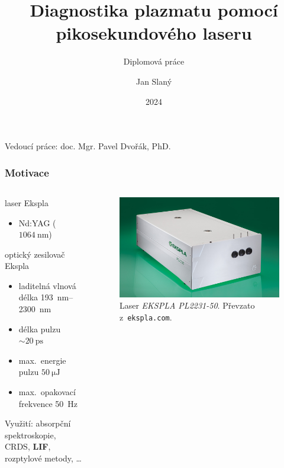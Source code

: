 \documentclass[10pt]{beamer}
\title[Laserová diagnostika plazmatu]
{Diagnostika plazmatu pomocí pikosekundového laseru}
\subtitle{Diplomová práce}
\date{2024}
\author{Jan Slaný}
\institute[PřF MUNI]{Přírodovědecká fakulta Masarykovy univerzity\\
	Ústav fyziky a~technologií plazmatu}
\begin{document}
\begin{frame}[plain]
	\titlepage
	Vedoucí práce: \hfill doc. Mgr. Pavel Dvořák, PhD.
\end{frame}

\begin{frame}
	\frametitle{Motivace}
	\begin{columns}
	\begin{column}{0.5\textwidth}
		laser Ekspla 
		\begin{itemize}
			\item Nd:YAG ($\SI{1064}{\nano\metre}$)
		\end{itemize}
		\medskip
		optický zesilovač Ekspla 
		\begin{itemize}
			\item laditelná vlnová délka
			\SIrange{193}{2300}{\nano\metre}
			\item délka pulzu $\sim \SI{20}{\pico\second}$
			\item max.~energie pulzu $\SI{50}{\micro\joule}$
			\item max.~opakovací frekvence \SI{50}{\hertz}
		\end{itemize}
		\medskip
		Využití: absorpční spektroskopie, CRDS, \textbf{LIF},
		rozptylové metody, \textbf{\EFISH}\ldots
	\end{column}
	\begin{column}{0.5\textwidth}
		\begin{figure}
			\centering
			\includegraphics[width=\textwidth]{laser}
			\caption{Laser \emph{EKSPLA PL2231-50}.
				Převzato z~\texttt{ekspla.com}.}
		\end{figure}
	\end{column}
	\end{columns}
\end{frame}
\end{document}
